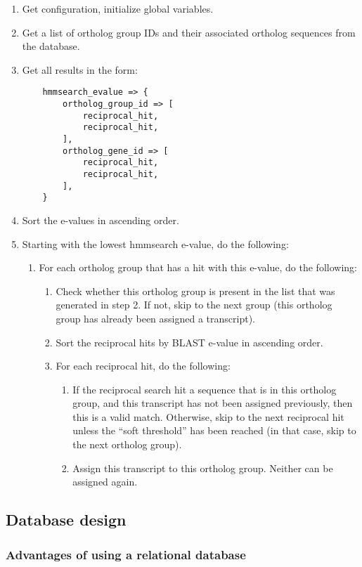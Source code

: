 \begin{enumerate}
	\item Get configuration, initialize global variables.
	\item Get a list of ortholog group IDs and their associated ortholog sequences
		from the database.
	\item Get all results in the form:
	\begin{lstlisting}
	hmmsearch_evalue => {
		ortholog_group_id => [
			reciprocal_hit,
			reciprocal_hit,
		],
		ortholog_gene_id => [
			reciprocal_hit,
			reciprocal_hit,
		],
	}
	\end{lstlisting}
	\item Sort the e-values in ascending order.
	\item Starting with the lowest hmmsearch e-value, do the following:
	\begin{enumerate}
		\item For each ortholog group that has a hit with this e-value, do the following:
		\begin{enumerate}
			\item Check whether this ortholog group is present in the list that was
				generated in step 2. If not, skip to the next group (this ortholog group
				has already been assigned a transcript).
			\item Sort the reciprocal hits by BLAST e-value in ascending order.
			\item For each reciprocal hit, do the following:
			\begin{enumerate}
				\item If the reciprocal search hit a sequence that is in this ortholog
					group, and this transcript has not been assigned previously, then this
					is a valid match. Otherwise, skip to the next reciprocal hit unless
					the ``soft threshold'' has been reached (in that case, skip to the
					next ortholog group).
				\item Assign this transcript to this ortholog group. Neither can be
					assigned again.
			\end{enumerate}
		\end{enumerate}
	\end{enumerate}
\end{enumerate}

\subsection{Database design}

\subsubsection{Advantages of using a relational database}

